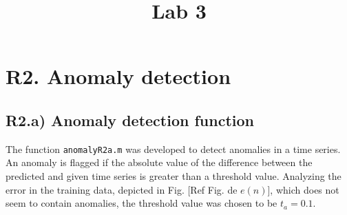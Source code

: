 \documentclass[]{scrartcl}
\title{Lab 3}
\author{}
\begin{document}
\maketitle

\begin{abstract}

\end{abstract}

\section{R2. Anomaly detection}\label{sec:R2}
\subsection{R2.a) Anomaly detection function}\label{sec:r2a}
The function \texttt{anomalyR2a.m} was developed to detect anomalies in a time series. An anomaly is flagged if the absolute value of the difference between the predicted and given time series is greater than a threshold value. Analyzing the error in the training data, depicted in Fig. [Ref Fig. de $e(n)$], which does not seem to contain anomalies, the threshold value was chosen to be $t_a = 0.1$.
\end{document}
